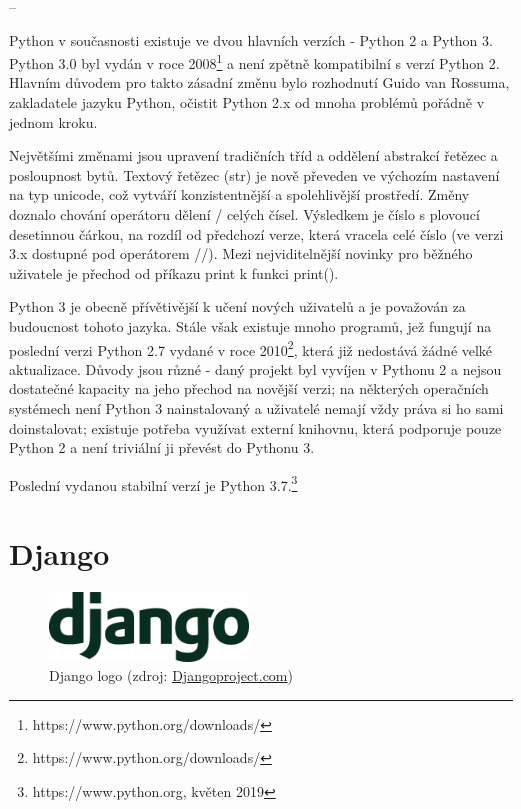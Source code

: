 --


Python v současnosti existuje ve dvou hlavních verzích - Python 2 a
Python 3. Python 3.0 byl vydán v roce
2008\footnote{https://www.python.org/downloads/} a není zpětně
kompatibilní s verzí Python 2. Hlavním důvodem pro takto zásadní změnu
bylo rozhodnutí Guido van Rossuma, zakladatele jazyku Python, očistit
Python 2.x od mnoha problémů pořádně v jednom kroku.

Největšími změnami jsou upravení tradičních tříd a oddělení abstrakcí
\textsf{řetězec} a \textsf{posloupnost bytů}. Textový řetězec
(\textsf{str}) je nově převeden ve výchozím nastavení na typ unicode,
což vytváří konzistentnější a spolehlivější prostředí. Změny doznalo
chování operátoru dělení \textsf{/} celých čísel. Výsledkem je číslo s
plovoucí desetinnou čárkou, na rozdíl od předchozí verze, která
vracela celé číslo (ve verzi 3.x dostupné pod operátorem
\textsf{//}). Mezi nejviditelnější novinky pro běžného uživatele je
přechod od příkazu \textsf{print} k funkci \textsf{print()}.

Python 3 je obecně přívětivější k učení nových uživatelů a je
považován za budoucnost tohoto jazyka. Stále však existuje mnoho
programů, jež fungují na poslední verzi Python 2.7 vydané v roce
2010\footnote{https://www.python.org/downloads/}, která již nedostává
žádné velké aktualizace. Důvody jsou různé - daný projekt byl vyvíjen
v Pythonu 2 a nejsou dostatečné kapacity na jeho přechod na novější
verzi; na některých operačních systémech není Python 3 nainstalovaný a
uživatelé nemají vždy práva si ho sami doinstalovat; existuje potřeba
využívat externí knihovnu, která podporuje pouze Python 2 a není
triviální ji převést do Pythonu 3.

Poslední vydanou stabilní verzí je Python
3.7.\footnote{https://www.python.org, květen 2019}

\section{Django}

\begin{figure}[H] \centering
      \includegraphics[width=150pt]{./pictures/django-logo-positive.png}
      \caption[Django logo]{Django logo (zdroj:
\href{https://static.djangoproject.com/img/logos/django-logo-positive.png}{Djangoproject.com})}
      \label{fig:django}
  \end{figure}


